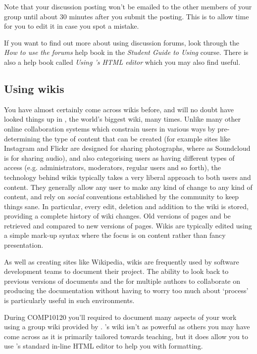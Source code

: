 Note that your discussion posting won't be emailed to the other members of your group until about 30 minutes after you submit the posting. This is to allow time for you to edit it in case you spot a mistake.

If you want to find out more about using discussion forums, look through the \emph{How to use the forums}  help book in the \emph{Student Guide to Using \Moodle} course. There is also a help book called \emph{Using \moodle's HTML editor} which you may also find useful.

\subsection{Using wikis}
\label{sec:using-wikis}


You have almost certainly come across wikis before, and will no doubt have looked things up in , the world's biggest wiki, many times. Unlike many other online collaboration systems which constrain users in various ways by pre-determining the type of content that can be created (for example sites like Instagram and Flickr are designed for sharing photographs, where as Soundcloud is for sharing audio), and also categorising users as having different types of access (e.g. administrators, moderators, regular users and so forth), the technology behind wikis typically takes a very liberal approach to both users and content. They generally allow any user to make any kind of change to any kind of content, and rely on \textit{social} conventions established by the community to keep things sane. In particular, every edit, deletion and addition to the wiki is stored, providing a complete history of wiki changes. Old versions of pages and be retrieved and compared to new versions of pages. Wikis are typically edited using a simple mark-up syntax where the focus is on content rather than fancy presentation.


As well as creating sites like Wikipedia, wikis are frequently used by software development teams to document their project. The ability to look back to previous versions of documents and the for multiple authors to collaborate on producing the documentation without having to worry too much about `process' is particularly useful in such environments.

During COMP10120 you'll required to document many aspects of your work using a group wiki provided by \Moodle. \Moodle's wiki isn't as powerful as others you may have come across as it is primarily tailored towards teaching, but it does allow you to use \Moodle's standard in-line HTML editor to help you with formatting.

